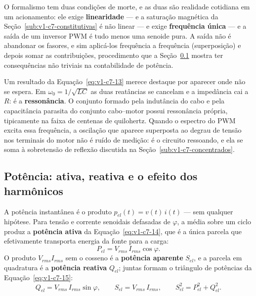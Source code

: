 \documentclass[12pt,a4paper]{article}
\numberwithin{equation}{section}
\numberwithin{table}{section}
\numberwithin{figure}{section}
\begin{document}
O formalismo tem duas condições de morte, e as duas são realidade cotidiana em
um acionamento: ele exige \textbf{linearidade} --- e a saturação magnética da
Seção~\ref{sub:v1-c7-constitutivas} é não linear --- e exige \textbf{frequência
única} --- e a saída de um inversor PWM é tudo menos uma senoide pura. A saída
não é abandonar os fasores, e sim aplicá-los frequência a frequência
(superposição) e depois somar as contribuições, procedimento que a
Seção~\ref{sub:v1-c7-potencia} mostra ter consequências não triviais na
contabilidade de potência.

Um resultado da Equação~\eqref{eq:v1-c7-13} merece destaque por aparecer onde
não se espera. Em $\omega_0 = 1/\sqrt{LC}$ as duas reatâncias se cancelam e a
impedância cai a $R$: é a \textbf{ressonância}. O conjunto formado pela
indutância do cabo e pela capacitância parasita do conjunto cabo--motor
possui ressonância própria, tipicamente na faixa de centenas de quilohertz.
Quando o espectro do PWM excita essa frequência, a oscilação que aparece
superposta ao degrau de tensão nos terminais do motor não é ruído de medição:
é o circuito ressoando, e ela se soma à sobretensão de reflexão discutida na
Seção~\ref{sub:v1-c7-concentrados}.

\subsection{Potência: ativa, reativa e o efeito dos
harmônicos}\label{sub:v1-c7-potencia}

A potência instantânea é o produto $p_{el}(t) = v(t)\,i(t)$ --- sem qualquer
hipótese. Para tensão e corrente senoidais defasadas de $\varphi$, a média
sobre um ciclo produz a \textbf{potência ativa} da
Equação~\eqref{eq:v1-c7-14}, que é a única parcela que efetivamente transporta
energia da fonte para a carga:
\begin{equation}\label{eq:v1-c7-14}
P_{el} = V_{rms}\,I_{rms}\cos\varphi .
\end{equation}
O produto $V_{rms}I_{rms}$ sem o cosseno é a \textbf{potência aparente}
$S_{el}$, e a parcela em quadratura é a \textbf{potência reativa} $Q_{el}$;
juntas formam o triângulo de potências da Equação~\eqref{eq:v1-c7-15}:
\begin{equation}\label{eq:v1-c7-15}
Q_{el} = V_{rms}\,I_{rms}\sin\varphi,
\qquad
S_{el} = V_{rms}\,I_{rms},
\qquad
S_{el}^{2} = P_{el}^{2} + Q_{el}^{2} .
\end{equation}
\end{document}
